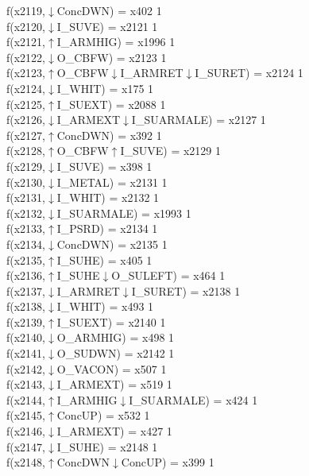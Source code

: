 f(x2119,$\downarrow$ConcDWN) = x402 {1} \\
f(x2120,$\downarrow$I\_SUVE) = x2121 {1} \\
f(x2121,$\uparrow$I\_ARMHIG) = x1996 {1} \\
f(x2122,$\downarrow$O\_CBFW) = x2123 {1} \\
f(x2123,$\uparrow$O\_CBFW$\downarrow$I\_ARMRET$\downarrow$I\_SURET) = x2124 {1} \\
f(x2124,$\downarrow$I\_WHIT) = x175 {1} \\
f(x2125,$\uparrow$I\_SUEXT) = x2088 {1} \\
f(x2126,$\downarrow$I\_ARMEXT$\downarrow$I\_SUARMALE) = x2127 {1} \\
f(x2127,$\uparrow$ConcDWN) = x392 {1} \\
f(x2128,$\uparrow$O\_CBFW$\uparrow$I\_SUVE) = x2129 {1} \\
f(x2129,$\downarrow$I\_SUVE) = x398 {1} \\
f(x2130,$\downarrow$I\_METAL) = x2131 {1} \\
f(x2131,$\downarrow$I\_WHIT) = x2132 {1} \\
f(x2132,$\downarrow$I\_SUARMALE) = x1993 {1} \\
f(x2133,$\uparrow$I\_PSRD) = x2134 {1} \\
f(x2134,$\downarrow$ConcDWN) = x2135 {1} \\
f(x2135,$\uparrow$I\_SUHE) = x405 {1} \\
f(x2136,$\uparrow$I\_SUHE$\downarrow$O\_SULEFT) = x464 {1} \\
f(x2137,$\downarrow$I\_ARMRET$\downarrow$I\_SURET) = x2138 {1} \\
f(x2138,$\downarrow$I\_WHIT) = x493 {1} \\
f(x2139,$\uparrow$I\_SUEXT) = x2140 {1} \\
f(x2140,$\downarrow$O\_ARMHIG) = x498 {1} \\
f(x2141,$\downarrow$O\_SUDWN) = x2142 {1} \\
f(x2142,$\downarrow$O\_VACON) = x507 {1} \\
f(x2143,$\downarrow$I\_ARMEXT) = x519 {1} \\
f(x2144,$\uparrow$I\_ARMHIG$\downarrow$I\_SUARMALE) = x424 {1} \\
f(x2145,$\uparrow$ConcUP) = x532 {1} \\
f(x2146,$\downarrow$I\_ARMEXT) = x427 {1} \\
f(x2147,$\downarrow$I\_SUHE) = x2148 {1} \\
f(x2148,$\uparrow$ConcDWN$\downarrow$ConcUP) = x399 {1} \\
